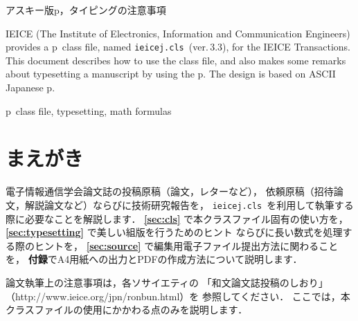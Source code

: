 \documentclass[paper]{ieicej}%
\def\IEICEJcls{\texttt{ieicej.cls}}
\def\IEICEJver{3.3}
\begin{document}
\makeatletter
\if@letter
  \makeatother
  \maketitle
\fi
\begin{abstract}
  子情報通信学会論文誌の p\LaTeXe\ クラスファイル，
  \IEICEJcls{}（\texttt{version \IEICEJver}）の使い方を説明します．
  本クラスファイルに基づく記述の仕方，クラスファイル使用上の注意点，
  ならびにタイピングの際の注意事項です．
  本クラスファイルは，アスキー版 p\LaTeXe\ に基づいて作成しています．
\end{abstract}
\begin{keyword}
  アスキー版p\LaTeXe{}，タイピングの注意事項
\end{keyword}
\begin{eabstract}
  IEICE (The Institute of Electronics, Information and Communication Engineers)
  provides a p\LaTeXe\ class file, named \IEICEJcls\ (ver.\,\IEICEJver),
  for the IEICE Transactions. This document describes how to use
  the class file, and also makes some remarks about typesetting
  a manuscript by using the p\LaTeXe.
  The design is based on ASCII Japanese p\LaTeXe.
\end{eabstract}
\begin{ekeyword}
  p\LaTeXe\ class file, typesetting, math formulas
\end{ekeyword}
\makeatletter
\if@letter
  \makeatother
\else
  \maketitle
\fi

\section{まえがき}

電子情報通信学会論文誌の投稿原稿（論文，レターなど），
依頼原稿（招待論文，解説論文など）ならびに技術研究報告を，
\IEICEJcls\ を利用して執筆する際に必要なことを解説します．
{\bfseries \ref{sec:cls}} で本クラスファイル固有の使い方を，
{\bfseries \ref{sec:typesetting}} で美しい組版を行うためのヒント
ならびに長い数式を処理する際のヒントを，
{\bfseries \ref{sec:source}} で編集用電子ファイル提出方法に関わることを，
{\bfseries 付録}でA4用紙への出力とPDFの作成方法について説明します．

論文執筆上の注意事項は，各ソサイエティの
「和文論文誌投稿のしおり」
（http://www.ieice.org\slash{}jpn\slash{}ronbun.html）を
参照してください．
ここでは，本クラスファイルの使用にかかわる点のみを説明します．
\end{document}
